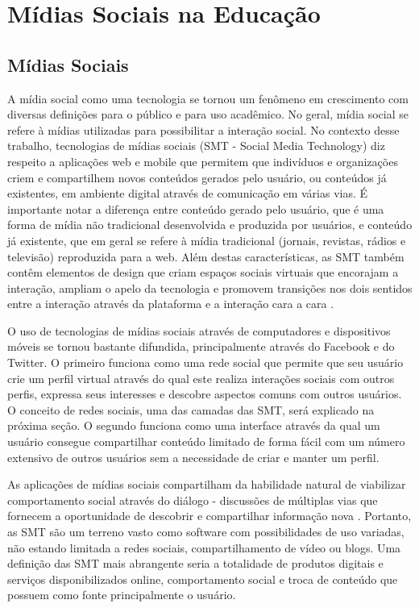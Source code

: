 \chapter{Mídias Sociais na Educação}
\label{cap:midias-sociais}

\section{Mídias Sociais}

A mídia social como uma tecnologia se tornou um fenômeno em crescimento com
diversas definições para o público e para uso acadêmico. No geral, mídia social
se refere à mídias utilizadas para possibilitar a interação social. No contexto
desse trabalho, tecnologias de mídias sociais (SMT - Social Media Technology)
diz respeito a aplicações web e mobile que permitem que indivíduos e organizações
criem e compartilhem novos conteúdos gerados pelo usuário, ou conteúdos já
existentes, em ambiente digital através de comunicação em várias vias. É
importante notar a diferença entre conteúdo gerado pelo usuário, que é uma forma
de mídia não tradicional desenvolvida e produzida por usuários, e conteúdo já
existente, que em geral se refere à mídia tradicional (jornais, revistas, rádios
e televisão) reproduzida para a web. Além destas características, as SMT também
contêm elementos de design que criam espaços sociais virtuais que encorajam a 
interação, ampliam o apelo da tecnologia e promovem transições nos dois sentidos
entre a interação através da plataforma e a interação cara a cara
\cite{davis2012}.

O uso de tecnologias de mídias sociais através de computadores e dispositivos móveis
se tornou bastante difundida, principalmente através do Facebook e do Twitter.
%
O primeiro funciona como uma rede social que permite que seu usuário crie um 
perfil virtual através do qual este realiza interações sociais com outros perfis,
expressa seus interesses e descobre aspectos comuns com outros usuários. O conceito
de redes sociais, uma das camadas das SMT, será explicado na próxima seção.
%
O segundo funciona como uma interface através da qual um usuário consegue
compartilhar conteúdo limitado de forma fácil com um número extensivo de outros
usuários sem a necessidade de criar e manter um perfil.

As aplicações de mídias sociais compartilham da habilidade natural de viabilizar
comportamento social através do diálogo - discussões de múltiplas vias que
fornecem a oportunidade de descobrir e compartilhar informação nova
\cite{solis2008}.
%
Portanto, as SMT são um terreno vasto como software com possibilidades de uso
variadas, não estando limitada a redes sociais, compartilhamento de vídeo ou
blogs. Uma definição das SMT mais abrangente seria a totalidade de produtos
digitais e serviços disponibilizados online, comportamento social e troca de
conteúdo que possuem como fonte principalmente o usuário.

